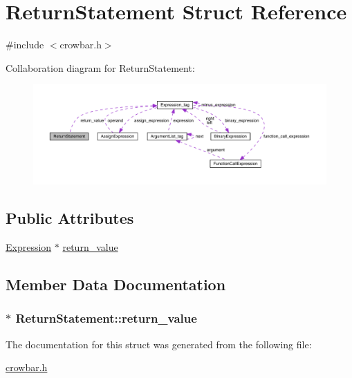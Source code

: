 \hypertarget{struct_return_statement}{}\section{Return\+Statement Struct Reference}
\label{struct_return_statement}


{\ttfamily \#include $<$crowbar.\+h$>$}



Collaboration diagram for Return\+Statement\+:\nopagebreak
\begin{figure}[H]
\begin{center}
\leavevmode
\includegraphics[width=350pt]{struct_return_statement__coll__graph}
\end{center}
\end{figure}
\subsection*{Public Attributes}
\begin{DoxyCompactItemize}
\item 
\hyperlink{crowbar_8h_a070c6feb370aad8a9665ca315bf6ed4a}{Expression} $\ast$ \hyperlink{struct_return_statement_ae0abf27e1b4dc529fdd363d80b640b88}{return\+\_\+value}
\end{DoxyCompactItemize}


\subsection{Member Data Documentation}
\hypertarget{struct_return_statement_ae0abf27e1b4dc529fdd363d80b640b88}{}
\subsubsection[{return\+\_\+value}]{$\ast$ Return\+Statement\+::return\+\_\+value}\label{struct_return_statement_ae0abf27e1b4dc529fdd363d80b640b88}


The documentation for this struct was generated from the following file\+:\begin{DoxyCompactItemize}
\item 
\hyperlink{crowbar_8h}{crowbar.\+h}\end{DoxyCompactItemize}
